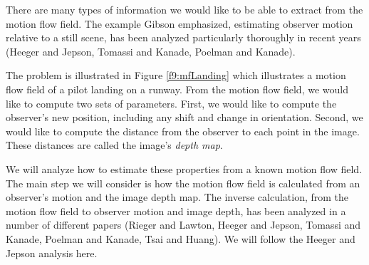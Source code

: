 There are many types of information we would like
to be able to extract from the motion flow field.
The example Gibson emphasized,
estimating observer motion relative to a still scene,
has been analyzed particularly
thoroughly in recent years
(Heeger and Jepson,  Tomassi and Kanade, Poelman and Kanade).

The problem is illustrated
in Figure \ref{f9:mfLanding} 
which illustrates a motion flow field of a pilot landing on a runway.
From the motion flow field, we would like to compute two sets
of parameters.
First, we would like to compute the observer's new position,
including any shift and change in orientation.
Second, we would like to compute the distance from
the observer to each point in the image.
These distances are called the image's {\em depth map}.

We will analyze how to estimate these properties from
a known motion flow field.
The main step we will consider
is how the motion flow field
is calculated from an observer's motion and the image depth map.
The inverse calculation, from the motion flow field to
observer motion and image depth, has been analyzed
in a number of different papers (Rieger and Lawton,
Heeger and Jepson, Tomassi and Kanade, Poelman and Kanade,
Tsai and Huang).
We will follow the Heeger and Jepson analysis here.

